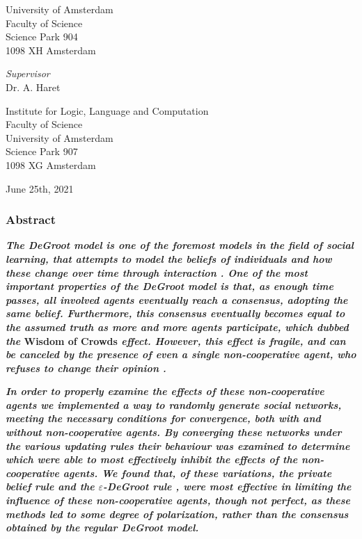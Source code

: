 \documentclass[a4paper, 12pt]{report}
\newcommand{\theSupervisor}{Dr. A. Haret} %
\newcommand{\theInstitute}{
Institute for Logic, Language and Computation\\ %
Faculty of Science\\
University of Amsterdam\\
Science Park 907 \\ %
1098 XG Amsterdam %
}
\newcommand{\theDate}{June 25th, 2021}
\begin{document}
\begin{center}
University of Amsterdam\\
Faculty of Science\\
Science Park 904\\
1098 XH Amsterdam

\vspace{2cm}

\emph{Supervisor}\\

\theSupervisor

\vspace{0.25cm}

\theInstitute

\vspace{1.0cm}

\theDate

\end{center}
\newpage

\thispagestyle{empty}

\tableofcontents

\thispagestyle{empty}


\newpage
\thispagestyle{empty}
\subsubsection{Abstract}

\noindent \textbf{\textit{The DeGroot model \parencite{degroot1974concensus} is one of the foremost models in the field of social learning, that attempts to model the beliefs of individuals and how these change over time through interaction \parencite{reed2010sociallearning}. One of the most important properties of the DeGroot model is that, as enough time passes, all involved agents eventually reach a consensus, adopting the same belief. Furthermore, this consensus eventually becomes equal to the assumed truth as more and more agents participate, which \cite{golub2010naive} dubbed the} Wisdom of Crowds \textit{effect. However, this effect is fragile, and can be canceled by the presence of even a single non-cooperative agent, who refuses to change their opinion \parencite{amir2021robust}.}}

\textbf{\textit{In order to properly examine the effects of these non-cooperative agents we implemented a way to randomly generate social networks, meeting the necessary conditions for convergence, both with and without non-cooperative agents. By converging these networks under the various updating rules their behaviour was examined to determine which were able to most effectively inhibit the effects of the non-cooperative agents. We found that, of these variations, the private belief rule \parencite{friedkin1990private} and the $\varepsilon$-DeGroot rule \parencite{amir2021robust}, were most effective in limiting the influence of these non-cooperative agents, though not perfect, as these methods led to some degree of polarization, rather than the consensus obtained by the regular DeGroot model.}} 
\end{document}

